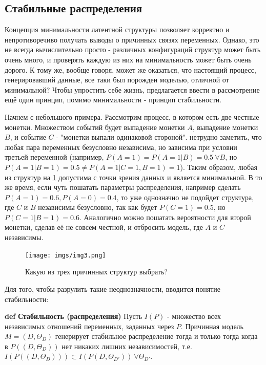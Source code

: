 \documentclass[fleqn]{article}
\def\define#1{\textbf{def} \textbf{#1}}
\begin{document}
\subsection*{Стабильные распределения}

Концепция минимальности латентной структуры позволяет корректно и непротиворечиво получать выводы о причинных связях переменных. Однако, это не всегда вычислительно просто - различных конфигураций структур может быть очень много, и проверять каждую из них на минимальность может быть очень дорого. К тому же, вообще говоря, может же оказаться, что настоящий процесс, генерировавший данные, все таки был порожден моделью, отличной от минимальной? Чтобы упростить себе жизнь, предлагается ввести в рассмотрение ещё один принцип, помимо минимальности - принцип стабильности. 

Начнем с небольшого примера. Рассмотрим процесс, в котором есть две честные монетки. Множеством событий будет выпадение монетки $A$, выпадение монетки $B$, и событие $C$ - "монетки выпали одинаковой стороной". нетрудно заметить, что любая пара переменных безусловно независима, но зависима при условии третьей переменной (например, $P(A=1) = P(A=1|B) = 0.5\ \forall B$, но $P(A=1|B=1) =0.5\neq P(A=1|C=1,B=1) = 1$). Таким образом, любая из структур на \ref{fig:choice} допустима с точки зрения данных и является минимальной. В то же время, если чуть пошатать параметры распределения, например сделать $P(A=1) = 0.6, P(A=0)=0.4$, то уже однозначно не подойдет структура, где $C$ и $B$ независимы безусловно, так как будет $P(C=1) = 0.5$, но $P(C=1|B=1) = 0.6$. Аналогично можно пошатать вероятности для второй монетки, сделав её не совсем честной, и отбросить модель, где $A$ и $C$ независимы.

\begin{figure}[h]
	\begin{center}
		\texttt{[image: imgs/img3.png]}
	\end{center}
	\caption{Какую из трех причинных структур выбрать?}
	\label{fig:choice}
\end{figure}

Для того, чтобы разрулить такие неоднозначности, вводится понятие стабильности:

\define{Стабильность (распределения)} Пусть $I(P)$ - множество всех независимых отношений переменных, заданных через $P$. Причинная модель $M = (D, \Theta_D)$ генерирует стабильное распределение тогда и только тогда когда в $P((D, \Theta_D))$ нет никаких лишних независимостей, т.е. $I(P((D, \Theta_D))) \subset I(P(D, \Theta_{D'}))\ \forall \Theta_{D'}$.
\end{document}
